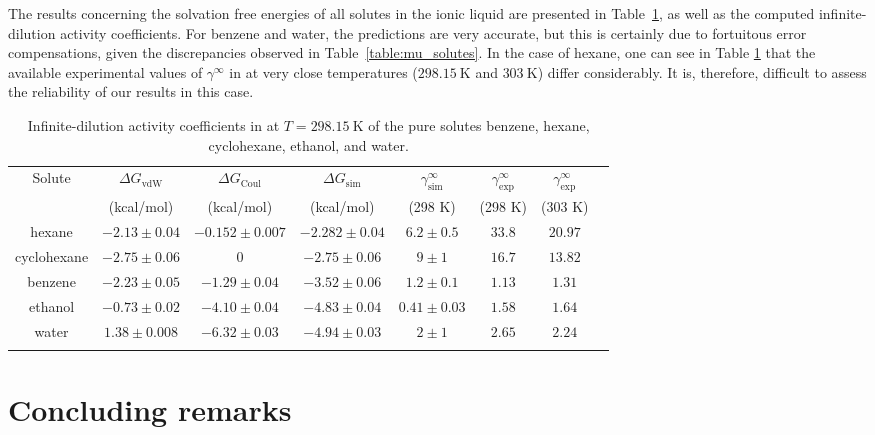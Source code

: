 \documentclass[3p,twocolumn]{elsarticle}
\begin{document}
The results concerning the solvation free energies of all solutes in the ionic liquid are presented in Table~\ref{table:gamma}, as well as the computed infinite-dilution activity coefficients.
For benzene and water, the predictions are very accurate, but this is certainly due to fortuitous error compensations, given the discrepancies observed in Table~\ref{table:mu_solutes}.
In the case of hexane, one can see in Table \ref{table:gamma} that the available experimental values of $\gamma^\infty$ in \ce{[emim][B(CN)_4]} at very close temperatures ($298.15~\text{K}$ and $303~\text{K}$) differ considerably.
It is, therefore, difficult to assess the reliability of our results in this case.

\begin{table}
	\centering
	\caption{Infinite-dilution activity coefficients in \ce{[emim][B(CN)_4]} at $T = 298.15~\text{K}$ of the pure solutes benzene, hexane, cyclohexane, ethanol, and water.}
	\begin{adjustbox}{width=1\textwidth}
		\begin{tabular}{cccccccc}  
			\hline\hline
			Solute & $\Delta G_\text{vdW}$  & $\Delta G_\text{Coul}$  & $\Delta G_\text{sim}$  & $\gamma^\infty_\text{sim}$ & $\gamma^\infty_\text{exp}$ \cite{Doma_ska_2011} & $\gamma^\infty_\text{exp}$ \cite{Yan_2010} \\
			& (kcal/mol) & (kcal/mol) &  (kcal/mol)  & (298 K) & (298 K)  & (303 K) \\
			\hline
			hexane & $-2.13 \pm 0.04$ & $-0.152 \pm 0.007$ & $-2.282 \pm 0.04$ & $6.2 \pm 0.5$ & $33.8$ & $20.97$  \\
			cyclohexane & $-2.75 \pm 0.06$ & 0 & $-2.75 \pm 0.06$ & $9 \pm 1$ & $16.7$ & $13.82$ \\
			benzene & $-2.23 \pm 0.05$ & $-1.29 \pm 0.04$ & $-3.52 \pm 0.06$ & $1.2 \pm 0.1$ & $1.13$ & $1.31$ \\ 
			ethanol & $-0.73 \pm 0.02$ & $-4.10 \pm 0.04$ & $-4.83 \pm 0.04$ & $0.41 \pm 0.03$ & $1.58$ & $1.64$  \\
			water & $1.38 \pm 0.008$ & $-6.32 \pm 0.03$ & $-4.94 \pm 0.03$ & $2 \pm 1$ & $2.65$ & $2.24$ \\
			\hline\hline
			\label{table:gamma} 
		\end{tabular}
	\end{adjustbox}
\end{table}

\section{Concluding remarks}
\label{sec:conclusion}
\end{document}
